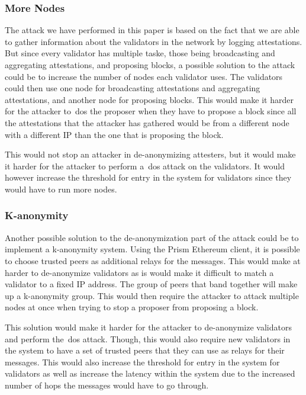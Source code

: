 \subsubsection{More Nodes}\label{subsubsec:more-nodes}
The attack we have performed in this paper is based on the fact that we are able to gather information about the validators in the network by logging attestations.
But since every validator has multiple taske, those being broadcasting and aggregating attestations, and proposing blocks, a possible solution to the attack could be to increase the number of nodes each validator uses.
The validators could then use one node for broadcasting attestations and aggregating attestations, and another node for proposing blocks.
This would make it harder for the attacker to~\gls{dos} the proposer when they have to propose a block since all the attestations that the attacker has gathered would be from a different node with a different IP than the one that is proposing the block.

This would not stop an attacker in de-anonymizing attesters, but it would make it harder for the attacker to perform a~\gls{dos} attack on the validators.
It would however increase the threshold for entry in the system for validators since they would have to run more nodes.

\subsubsection{K-anonymity}\label{subsubsec:k-anonymity}
Another possible solution to the de-anonymization part of the attack could be to implement a k-anonymity system.
Using the Prism Ethereum client, it is possible to choose trusted peers as additional relays for the messages.
This would make at harder to de-anonymize validators as is would make it difficult to match a validator to a fixed IP address.
The group of peers that band together will make up a k-anonymity group.
This would then require the attacker to attack multiple nodes at once when trying to stop a proposer from proposing a block.

This solution would make it harder for the attacker to de-anonymize validators and perform the~\gls{dos} attack.
Though, this would also require new validators in the system to have a set of trusted peers that they can use as relays for their messages.
This would also increase the threshold for entry in the system for validators as well as increase the latency within the system due to the increased number of hops the messages would have to go through.